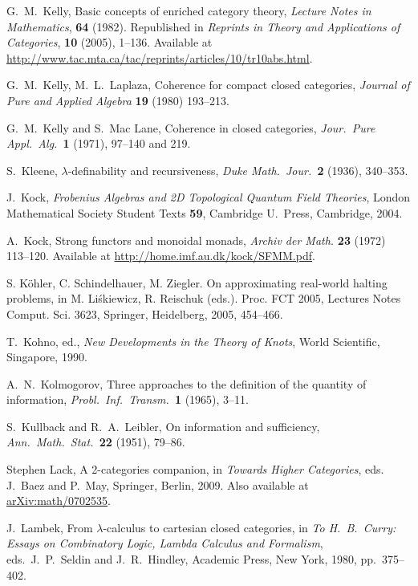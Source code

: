 \documentclass[12pt,twoside,openright]{report}
\begin{document}
\begin{thebibliography}{99}
 G.\ M.\ Kelly, Basic concepts of enriched category theory, \textsl{Lecture Notes in Mathematics}, \textbf{64} (1982).  Republished in \textsl{Reprints in Theory and Applications of Categories}, \textbf{10} (2005), 1--136.  Available at \href{http://www.tac.mta.ca/tac/reprints/articles/10/tr10abs.html}{http://www.tac.mta.ca/tac/reprints/articles/10/tr10abs.html}.

 G.\ M.\ Kelly, M.\ L.\ Laplaza, Coherence for compact closed categories, \textsl{Journal of Pure and Applied Algebra} \textbf{19} (1980) 193--213.

 G.\ M.\ Kelly and S.\ Mac Lane, Coherence in closed categories, {\sl Jour.\ Pure Appl.\ Alg.\ }{\bf 1} (1971), 97--140
and 219.

S.\ Kleene, $\lambda$-definability and recursiveness,
{\sl Duke Math.\ Jour.\ }{\bf 2} (1936), 340--353. 

J.\ Kock, \textsl{Frobenius Algebras and 2{D} Topological Quantum Field Theories}, London Mathematical Society Student Texts \textbf{59}, Cambridge U.\ Press, Cambridge, 2004.

 A.\ Kock, Strong functors and monoidal monads, \textsl{Archiv der Math.} \textbf{23} (1972) 113--120.  Available at \href{http://home.imf.au.dk/kock/SFMM.pdf}{http://home.imf.au.dk/kock/SFMM.pdf}.

  S. K\"ohler, C. Schindelhauer, M. Ziegler. On approximating real-world halting problems, in M. Li\'skiewicz, R. Reischuk (eds.). Proc. FCT 2005, Lectures Notes Comput. Sci. 3623, Springer, Heidelberg, 2005, 454--466.

T.\ Kohno, ed., \textsl{New Developments in the Theory of Knots}, World Scientific, Singapore, 1990.

 A.\ N.\ Kolmogorov, Three approaches to the definition of the quantity of information, 
{\sl Probl.\ Inf.\ Transm.\ }\textbf{1} (1965), 3--11.

 S.\ Kullback and R.\ A.\ Leibler, On information and sufficiency, \textsl{Ann.\ Math.\ Stat.\ }\textbf{22}
(1951), 79--86.

 Stephen Lack, A 2-categories companion, in \textsl{Towards Higher Categories}, eds. J.\ Baez and P.\ May, Springer, Berlin, 2009.  Also available at \href{http://arxiv.org/abs/math/0702535}{arXiv:math/0702535}.

 J.\ Lambek, From $\lambda$-calculus to cartesian closed categories, in {\sl To H.\ B.\ Curry: Essays on Combinatory Logic, Lambda Calculus and Formalism}, eds.\ J.\ P.\ Seldin and J.\
R.\ Hindley, Academic Press, New York, 1980, pp.\ 375--402. 


\end{thebibliography}
\end{document}
